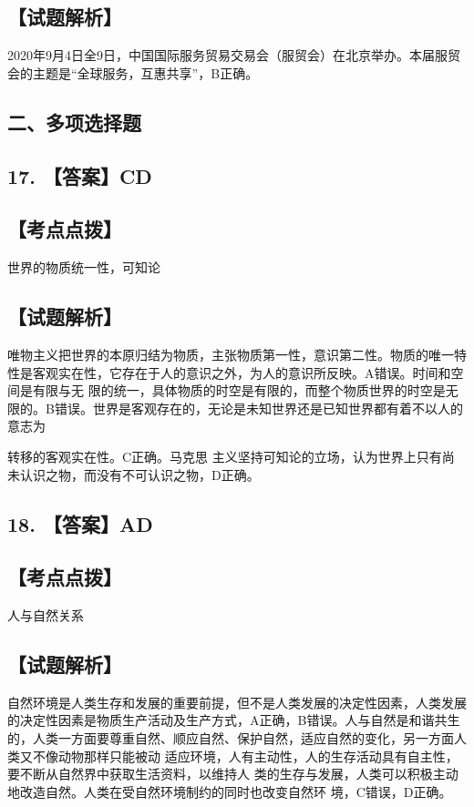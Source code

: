\documentclass[UTF8,11pt]{ctexart}
\begin{document}
\subsection*{【试题解析】}

2020年9月4日全9日，中国国际服务贸易交易会（服贸会）在北京举办。本届服贸会的主题是“全球服务，互惠共享”，B正确。


\subsection*{二、多项选择题}

\subsection*{17. 【答案】CD}

\subsection*{【考点点拨】}

世界的物质统一性，可知论


\subsection*{【试题解析】}

唯物主义把世界的本原归结为物质，主张物质第一性，意识第二性。物质的唯一特性是客观实在性，它存在于人的意识之外，为人的意识所反映。A错误。时间和空间是有限与无 限的统一，具体物质的时空是有限的，而整个物质世界的时空是无限的。B错误。世界是客观存在的，无论是未知世界还是已知世界都有着不以人的意志为


转移的客观实在性。C正确。马克思 主义坚持可知论的立场，认为世界上只有尚未认识之物，而没有不可认识之物，D正确。


\subsection*{18. 【答案】AD}

\subsection*{【考点点拨】}

人与自然关系


\subsection*{【试题解析】}

自然环境是人类生存和发展的重要前提，但不是人类发展的决定性因素，人类发展 的决定性因素是物质生产活动及生产方式，A正确，B错误。人与自然是和谐共生的，人类一方面要尊重自然、顺应自然、保护自然，适应自然的变化，另一方面人类又不像动物那样只能被动 适应环境，人有主动性，人的生存活动具有自主性，要不断从自然界中获取生活资料，以维持人 类的生存与发展，人类可以积极主动地改造自然。人类在受自然环境制约的同时也改变自然环 境，C错误，D正确。
\end{document}
